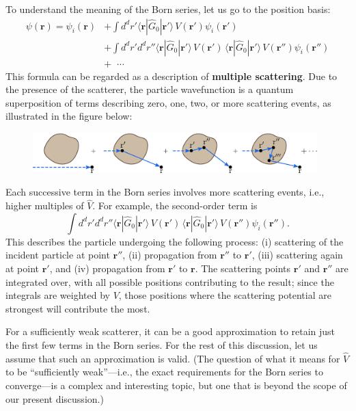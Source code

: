 \documentclass[pra,12pt]{revtex4}
\begin{document}
To understand the meaning of the Born series, let us go to the
position basis:
$$\begin{aligned}\psi(\mathbf{r}) = \psi_i(\mathbf{r}) &+ \int d^dr' \langle \mathbf{r} | \hat{G}_0 |\mathbf{r}'\rangle\, V(\mathbf{r}') \psi_i(\mathbf{r}') \\ &+ \int d^dr' d^dr'' \langle \mathbf{r} | \hat{G}_0 |\mathbf{r}'\rangle\, V(\mathbf{r}') \, \langle \mathbf{r} | \hat{G}_0 |\mathbf{r}'\rangle \, V(\mathbf{r}'') \psi_i(\mathbf{r}'') \\ &+ \;\;\cdots\end{aligned}$$
This formula can be regarded as a description of \textbf{multiple
  scattering}.  Due to the presence of the scatterer, the particle
wavefunction is a quantum superposition of terms describing zero, one,
two, or more scattering events, as illustrated in the figure below:

\begin{figure}[h!]
  \centering\includegraphics[width=0.98\textwidth]{bornseries}
\end{figure}

Each successive term in the Born series involves more scattering
events, i.e., higher multiples of $\hat{V}$.  For example, the
second-order term is
$$\int d^dr' d^dr'' \langle \mathbf{r} | \hat{G}_0 |\mathbf{r}'\rangle\, V(\mathbf{r}') \, \langle \mathbf{r} | \hat{G}_0 |\mathbf{r}'\rangle \, V(\mathbf{r}'') \psi_i(\mathbf{r}'').$$
This describes the particle undergoing the following process: (i)
scattering of the incident particle at point $\mathbf{r}''$, (ii)
propagation from $\mathbf{r}''$ to $\mathbf{r}'$, (iii) scattering
again at point $\mathbf{r}'$, and (iv) propagation from $\mathbf{r}'$
to $\mathbf{r}$.  The scattering points $\mathbf{r}'$ and
$\mathbf{r}''$ are integrated over, with all possible positions
contributing to the result; since the integrals are weighted by $V$,
those positions where the scattering potential are strongest will
contribute the most.

For a sufficiently weak scatterer, it can be a good approximation to
retain just the first few terms in the Born series.  For the rest of
this discussion, let us assume that such an approximation is valid.
(The question of what it means for $\hat{V}$ to be ``sufficiently
weak''---i.e., the exact requirements for the Born series to
converge---is a complex and interesting topic, but one that is beyond
the scope of our present discussion.)
\end{document}
